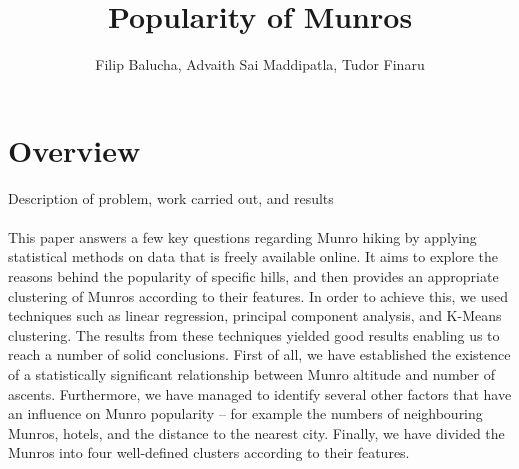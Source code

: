 \documentclass[11pt,a4paper]{article}
\title{Popularity of Munros}
\author{Filip Balucha, Advaith Sai Maddipatla, Tudor Finaru}
\begin{document}
\maketitle


\section{Overview}
Description of problem, work carried out, and results \\ \\ 
This paper answers a few key questions regarding Munro hiking by applying statistical methods on data that is freely available online. It aims to explore the reasons behind the popularity of specific hills, and then provides an appropriate clustering of Munros according to their features. In order to achieve this, we used techniques such as linear regression, principal component analysis, and K-Means clustering. The results from these techniques yielded good results enabling us to reach a number of solid conclusions. First of all, we have established the existence of a statistically significant relationship between Munro altitude and number of ascents. Furthermore, we have managed to identify several other factors that have an influence on Munro popularity – for example the numbers of neighbouring Munros, hotels, and the distance to the nearest city. Finally, we have divided the Munros into four well-defined clusters according to their features.
\end{document}
